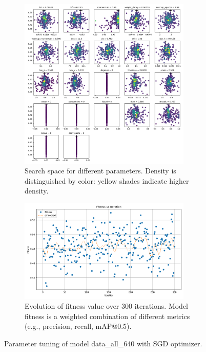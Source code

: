 \documentclass[Master,MDS,english]{BASE/twbook} %
\begin{document}
\begin{figure}[H]
\centering
\begin{subfigure}[t]{.5\textwidth}
  \centering
  \includegraphics[width=0.9\textwidth]{images/yolo/all/sgd/tune_scatter_plots}
  \caption{Search space for different parameters. Density is distinguished by color: yellow shades indicate higher density.}
\end{subfigure}%
\begin{subfigure}[t]{.5\textwidth}
  \centering
  \includegraphics[width=0.9\textwidth]{images/yolo/all/sgd/tune_fitness}
  \caption{Evolution of fitness value over 300 iterations. Model fitness is a weighted combination of different metrics (e.g., precision, recall, mAP@0.5).}
  \label{fig:images_from_videos}
\end{subfigure}
\caption{Parameter tuning of model data\_all\_640 with SGD optimizer. \\ }
\label{fig:yolo_tune_all_sgd}
\end{figure}

\end{document}
